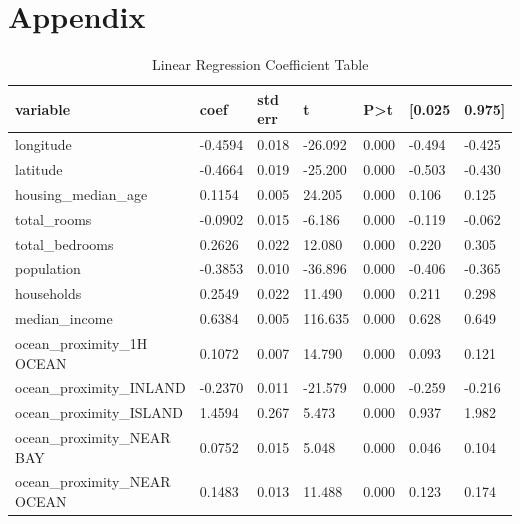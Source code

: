 \documentclass[11pt]{article}
\begin{document}
\section{Appendix}
\begin{table}[h]
    \centering
        \begin{tabular}{|l|l|l|l|l|l|l|} 
        \hline
        \textbf{variable} & \textbf{coef} & \textbf{std err} & \textbf{t} & \textbf{P\textgreater{}\textbar{}t\textbar{}} & \textbf{[0.025} & \textbf{0.975]} \\ 
        \hline
        longitude & -0.4594 & 0.018 & -26.092 & 0.000 & -0.494 & -0.425 \\ 
        \hline
        latitude & -0.4664 & 0.019 & -25.200 & 0.000 & -0.503 & -0.430 \\ 
        \hline
        housing\_median\_age & 0.1154 & 0.005 & 24.205 & 0.000 & 0.106 & 0.125 \\ 
        \hline
        total\_rooms & -0.0902 & 0.015 & -6.186 & 0.000 & -0.119 & -0.062 \\ 
        \hline
        total\_bedrooms & 0.2626 & 0.022 & 12.080 & 0.000 & 0.220 & 0.305 \\ 
        \hline
        population & -0.3853 & 0.010 & -36.896 & 0.000 & -0.406 & -0.365 \\ 
        \hline
        households & 0.2549 & 0.022 & 11.490 & 0.000 & 0.211 & 0.298 \\ 
        \hline
        median\_income & 0.6384 & 0.005 & 116.635 & 0.000 & 0.628 & 0.649 \\ 
        \hline
        ocean\_proximity\_1H OCEAN & 0.1072 & 0.007 & 14.790 & 0.000 & 0.093 & 0.121 \\ 
        \hline
        ocean\_proximity\_INLAND & -0.2370 & 0.011 & -21.579 & 0.000 & -0.259 & -0.216 \\ 
        \hline
        ocean\_proximity\_ISLAND & 1.4594 & 0.267 & 5.473 & 0.000 & 0.937 & 1.982 \\ 
        \hline
        ocean\_proximity\_NEAR BAY & 0.0752 & 0.015 & 5.048 & 0.000 & 0.046 & 0.104 \\ 
        \hline
        ocean\_proximity\_NEAR OCEAN & 0.1483 & 0.013 & 11.488 & 0.000 & 0.123 & 0.174 \\
        \hline
        \end{tabular}
\caption{Linear Regression Coefficient Table}
\label{tab:lin-reg-table}
\end{table}



\end{document}
